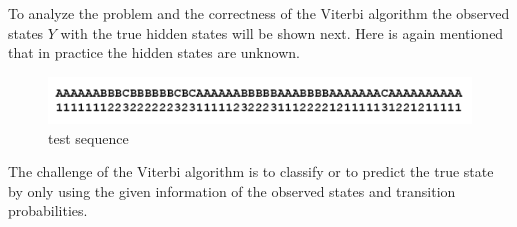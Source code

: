 \documentclass[12pt,journal,compsoc]{IEEEtran}
\begin{document}
To analyze the problem and the correctness of the Viterbi algorithm the observed states $Y$ with the true hidden states will be shown next. Here is again mentioned that in practice the hidden states are unknown. 

\begin{figure}[ht]
	\centering
  \includegraphics[scale=0.33]{figures/sequence.png}
	\caption{test sequence \cite{article:bissantz}}
	\label{figSequence}
\end{figure}

The challenge of the Viterbi algorithm is to classify or to predict the true state by only using the given information of the observed states and transition probabilities. 
\end{document}
